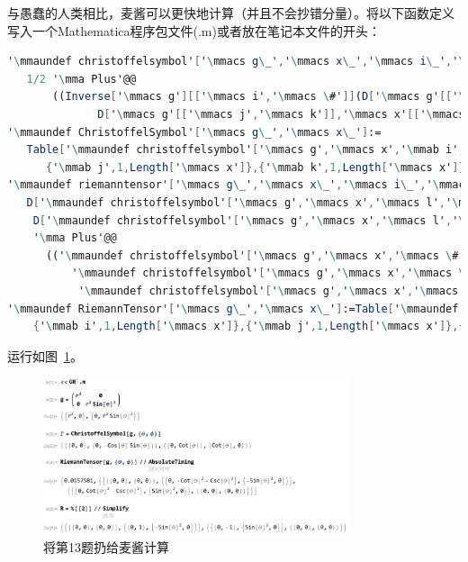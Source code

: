 \begin{xiti}
\begin{jie}
		与愚蠢的人类相比，麦酱可以更快地计算（并且不会抄错分量）。将以下函数定义写入一个Mathematica程序包文件(.m)或者放在笔记本文件的开头：
		\begin{lstlisting}[language=Mathematica]
'\mmaundef christoffelsymbol'['\mmacs g\_','\mmacs x\_','\mmacs i\_','\mmacs j\_','\mmacs k\_']:=
   1/2 '\mma Plus'@@
       ((Inverse['\mmacs g'][['\mmacs i','\mmacs \#']](D['\mmacs g'[['\mmacs \#','\mmacs j']],'\mmacs x'[['\mmacs k']]]+D['\mmacs g'[['\mmacs k','\mmacs \#']],'\mmacs x'[['\mmacs j']]]-
              D['\mmacs g'[['\mmacs j','\mmacs k']],'\mmacs x'[['\mmacs \#']]]))&)/@'\mma Range'[Length['\mmacs x']];
'\mmaundef ChristoffelSymbol'['\mmacs g\_','\mmacs x\_']:=
   Table['\mmaundef christoffelsymbol'['\mmacs g','\mmacs x','\mmab i','\mmab j','\mmab k'],{'\mmab i',1,Length['\mmacs x']},
      {'\mmab j',1,Length['\mmacs x']},{'\mmab k',1,Length['\mmacs x']}];
'\mmaundef riemanntensor'['\mmacs g\_','\mmacs x\_','\mmacs i\_','\mmacs j\_','\mmacs k\_','\mmacs l\_']:=
   D['\mmaundef christoffelsymbol'['\mmacs g','\mmacs x','\mmacs l','\mmacs i','\mmacs k'],'\mmacs x'[['\mmacs j']]]-
    D['\mmaundef christoffelsymbol'['\mmacs g','\mmacs x','\mmacs l','\mmacs j','\mmacs k'],'\mmacs x'[['\mmacs i']]]+
    '\mma Plus'@@
      (('\mmaundef christoffelsymbol'['\mmacs g','\mmacs x','\mmacs \#','\mmacs k','\mmacs i'] '\mmaundef christoffelsymbol'['\mmacs g','\mmacs x','\mmacs l','\mmacs j','\mmacs \#']-
          '\mmaundef christoffelsymbol'['\mmacs g','\mmacs x','\mmacs \#','\mmacs k','\mmacs j']
           '\mmaundef christoffelsymbol'['\mmacs g','\mmacs x','\mmacs l','\mmacs i','\mmacs \#'])&)/@'\mma Range'[Length['\mmacs x']];
'\mmaundef RiemannTensor'['\mmacs g\_','\mmacs x\_']:=Table['\mmaundef riemanntensor'['\mmacs g','\mmacs x','\mmab i','\mmab j','\mmab k','\mmab l'],
    {'\mmab i',1,Length['\mmacs x']},{'\mmab j',1,Length['\mmacs x']},{'\mmab k',1,Length['\mmacs x']},{'\mmab l',1,Length['\mmacs x']}];
		\end{lstlisting}
		运行如图~\ref{f3.1}。
		\begin{figure}[htb]
			\centering
			\includegraphics[width=0.8\textwidth]{pictures/1}
			\caption{将第13题扔给麦酱计算}\label{f3.1}
		\end{figure}
	\end{jie}


\end{xiti}
